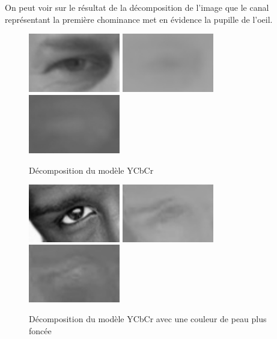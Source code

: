 On peut voir sur le résultat de la décomposition de l'image que le canal représentant la première chominance met 
en évidence la pupille de l'oeil.
\begin{figure}[H]
 \center
 \includegraphics[width=4cm]{image/luminance.png}
 \includegraphics[width=4cm]{image/chrominance1.png}
 \includegraphics[width=4cm]{image/chrominance2.png}
 \caption{Décomposition du modèle YCbCr}
\end{figure}

\begin{figure}[H]
 \center
 \includegraphics[width=4cm]{image/luminance_black.png}
 \includegraphics[width=4cm]{image/chrominance1_black.png}
 \includegraphics[width=4cm]{image/chrominance2_black.png}
 \caption{Décomposition du modèle YCbCr avec une couleur de peau plus foncée}
\end{figure}


